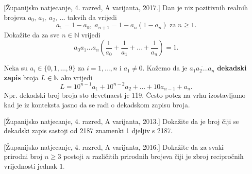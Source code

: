 \begin{exercise}{\unskip}[Županijsko natjecanje, 4. razred, A varijanta, 2017.]
Dan je niz pozitivnih realnih brojeva \(a_0\), \(a_1\), \(a_2\), \(\dots\) takvih da vrijedi
\[a_1=1-a_0,\; a_{n+1}=1-a_n(1-a_n) \; \mathrm{za} \; n\geq 1.\]
Dokažite da za sve \(n\in \mathbb{N}\) vrijedi
\[a_0a_1\dots a_n\left(\dfrac{1}{a_0}+\dfrac{1}{a_1}+\dots+ \dfrac{1}{a_n}\right)=1.\]
\end{exercise}
\begin{definition}
Neka su $a_i\in \{0, 1, \dots, 9\}$ za $i=1,\dots, n$ i $a_1\neq 0$. Kažemo da je $\overline{a_1a_2\dots a_n}$ \textbf{dekadski zapis} broja $L\in \mathbb{N}$ ako vrijedi
$$L=10^{n-1}a_1+10^{n-2}a_2+\dots+10a_{n-1}+a_n.$$
Npr. dekadski broj broja sto devetnaest je $\overline{119}$. Često potez na vrhu izostavljamo kad je iz konteksta jasno da se radi o dekadskom zapisu broja.
\end{definition}
\begin{exercise}{\unskip}[Županijsko natjecanje, 4. razred, A varijanta, 2013.]
Dokažite da je broj čiji se dekadski zapis sastoji od 2187 znamenki 1 djeljiv s 2187.
\end{exercise}
\begin{exercise}{\unskip}[Županijsko natjecanje, 4. razred, A varijanta, 2016.]
Dokažite da za svaki prirodni broj \(n\geq 3\) postoji \(n\) različitih prirodnih brojeva čiji je zbroj recipročnih vrijednosti jednak 1.
\end{exercise}